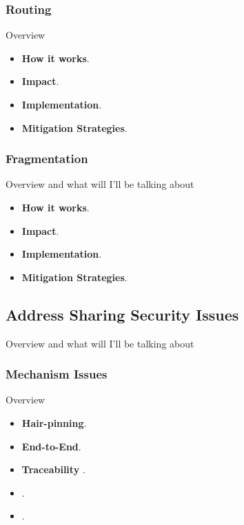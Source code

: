 \documentclass[iwp,first]{luthesis}
\begin{document}
\subsubsection {Routing}

Overview 

\begin{itemize}

	\item {\bf How it works}.

	\item {\bf Impact}.
 
	\item {\bf Implementation}.

	\item {\bf Mitigation Strategies}.

\end{itemize}


\subsubsection {Fragmentation}

Overview and what will I'll be talking about

\begin{itemize}

	\item {\bf How it works}.

	\item {\bf Impact}.
 
	\item {\bf Implementation}.

	\item {\bf Mitigation Strategies}.

\end{itemize}





\subsection{Address Sharing Security Issues}

Overview and what will I'll be talking about

\subsubsection {Mechanism Issues}

Overview

\begin{itemize}

	\item {\bf Hair-pinning}.

	\item {\bf End-to-End}.
 
	\item {\bf Traceability }.

	\item {\bf }.

	\item {\bf  }.

\end{itemize}
\end{document}
